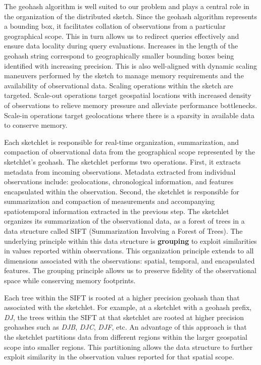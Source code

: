 The geohash algorithm is well suited to our problem and plays a central role in the organization of the distributed sketch. Since the geohash algorithm represents a bounding box, it facilitates collation of observations from a particular geographical scope. This in turn allows us to redirect queries effectively and ensure data locality during query evaluations. Increases in the length of the geohash string correspond to geographically smaller bounding boxes being identified with increasing precision. This is also well-aligned with dynamic scaling maneuvers performed by the sketch to manage memory requirements and the availability of observational data. Scaling operations within the sketch are targeted. Scale-out operations target geospatial locations with increased density of observations to relieve memory pressure and alleviate performance bottlenecks. Scale-in operations target geolocations where there is a sparsity in available data to conserve memory.

Each sketchlet is responsible for real-time organization, summarization, and compaction of observational data from the geographical scope represented by the sketchlet's geohash.  The sketchlet performs two operations. First, it extracts metadata from incoming observations. Metadata extracted from individual observations include: geolocations, chronological information, and features encapsulated within the observation. Second, the sketchlet is responsible for summarization and compaction of measurements and accompanying spatiotemporal information extracted in the previous step. The sketchlet organizes its summarization of the observational data, as a forest of trees in a data structure called SIFT (Summarization Involving a Forest of Trees). The underlying principle within this data structure is \textbf{grouping} to exploit similarities in values reported within observations. This organization principle extends to all dimensions associated with the observations: spatial, temporal, and encapsulated features. The grouping principle allows us to preserve fidelity of the observational space while conserving memory footprints.

Each tree within the SIFT is rooted at a higher precision geohash than that associated with the sketchlet. For example, at a sketchlet with a geohash prefix, \emph{DJ}, the trees within the SIFT at that sketchlet are rooted at higher precision geohashes such as \emph{DJB}, \emph{DJC}, \emph{DJF}, etc. An advantage of this approach is that the sketchlet partitions data from different regions within the larger geospatial scope into smaller regions. This partitioning allows the data structure to further exploit similarity in the observation values reported for that spatial scope. 

